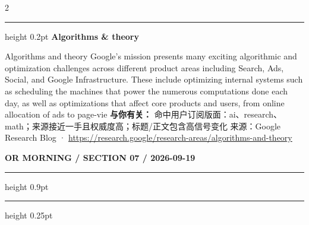 \documentclass[10.5pt]{ctexart}
\begin{document}
\begin{multicols}{2}
\vspace{2mm}
\hrule height 0.2pt
\vspace{2mm}
{\large\bfseries Algorithms \& theory}\par
Algorithms and theory Google’s mission presents many exciting algorithmic and optimization challenges across different product areas including Search, Ads, Social, and Google Infrastructure. These include optimizing internal systems such as scheduling the machines that power the numerous computations done each day, as well as optimizations that affect core products and users, from online allocation of ads to page-vie
\textbf{与你有关：} 命中用户订阅版面：ai、research、math；来源接近一手且权威度高；标题/正文包含高信号变化
{\footnotesize\color{ormuted} 来源：Google Research Blog · \url{https://research.google/research-areas/algorithms-and-theory}}
\end{multicols}
\newpage
{\small\bfseries OR MORNING / SECTION 07 / 2026-09-19}
\vspace{2mm}
\hrule height 0.9pt
\vspace{1.5mm}
\hrule height 0.25pt
\vspace{4mm}
\end{document}
